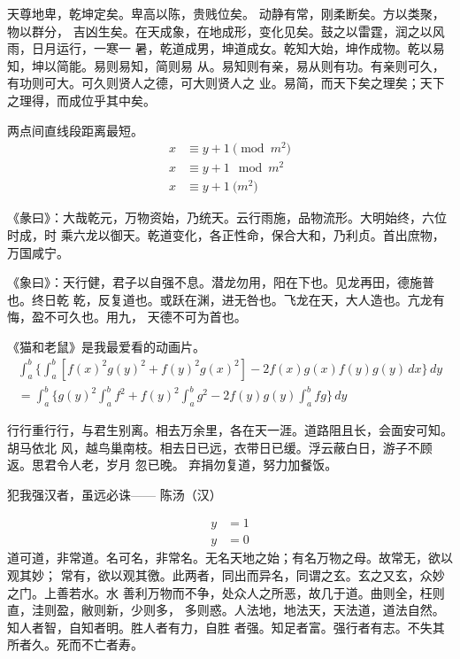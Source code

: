 天尊地卑，乾坤定矣。卑高以陈，贵贱位矣。 动静有常，刚柔断矣。方以类聚，物以群分，
吉凶生矣。在天成象，在地成形，变化见矣。鼓之以雷霆，润之以风雨，日月运行，一寒一
暑，乾道成男，坤道成女。乾知大始，坤作成物。乾以易知，坤以简能。易则易知，简则易
从。易知则有亲，易从则有功。有亲则可久，有功则可大。可久则贤人之德，可大则贤人之
业。易简，而天下矣之理矣；天下之理得，而成位乎其中矣。

\begin{axiom}
	两点间直线段距离最短。  
	\begin{align}
	x&\equiv y+1\pmod{m^2}\\
	x&\equiv y+1\mod{m^2}\\
	x&\equiv y+1\pod{m^2}
	\end{align}
\end{axiom}

《彖曰》：大哉乾元，万物资始，乃统天。云行雨施，品物流形。大明始终，六位时成，时
乘六龙以御天。乾道变化，各正性命，保合大和，乃利贞。首出庶物，万国咸宁。

《象曰》：天行健，君子以自强不息。潜龙勿用，阳在下也。见龙再田，德施普也。终日乾
乾，反复道也。或跃在渊，进无咎也。飞龙在天，大人造也。亢龙有悔，盈不可久也。用九，
天德不可为首也。 　　

\begin{lemma}
	《猫和老鼠》是我最爱看的动画片。
	\begin{multline*}%
	\int_a^b\biggl\{\int_a^b[f(x)^2g(y)^2+f(y)^2g(x)^2]
	-2f(x)g(x)f(y)g(y)\,dx\biggr\}\,dy \\
	=\int_a^b\biggl\{g(y)^2\int_a^bf^2+f(y)^2
	\int_a^b g^2-2f(y)g(y)\int_a^b fg\biggr\}\,dy
	\end{multline*}
\end{lemma}

行行重行行，与君生别离。相去万余里，各在天一涯。道路阻且长，会面安可知。胡马依北
风，越鸟巢南枝。相去日已远，衣带日已缓。浮云蔽白日，游子不顾返。思君令人老，岁月
忽已晚。  弃捐勿复道，努力加餐饭。

\begin{theorem}\label{the:theorem1}
	犯我强汉者，虽远必诛\hfill —— 陈汤（汉）
\end{theorem}
\begin{subequations}
	\begin{align}
	y & = 1 \\
	y & = 0
	\end{align}
\end{subequations}
道可道，非常道。名可名，非常名。无名天地之始；有名万物之母。故常无，欲以观其妙；
常有，欲以观其徼。此两者，同出而异名，同谓之玄。玄之又玄，众妙之门。上善若水。水
善利万物而不争，处众人之所恶，故几于道。曲则全，枉则直，洼则盈，敝则新，少则多，
多则惑。人法地，地法天，天法道，道法自然。知人者智，自知者明。胜人者有力，自胜
者强。知足者富。强行者有志。不失其所者久。死而不亡者寿。

